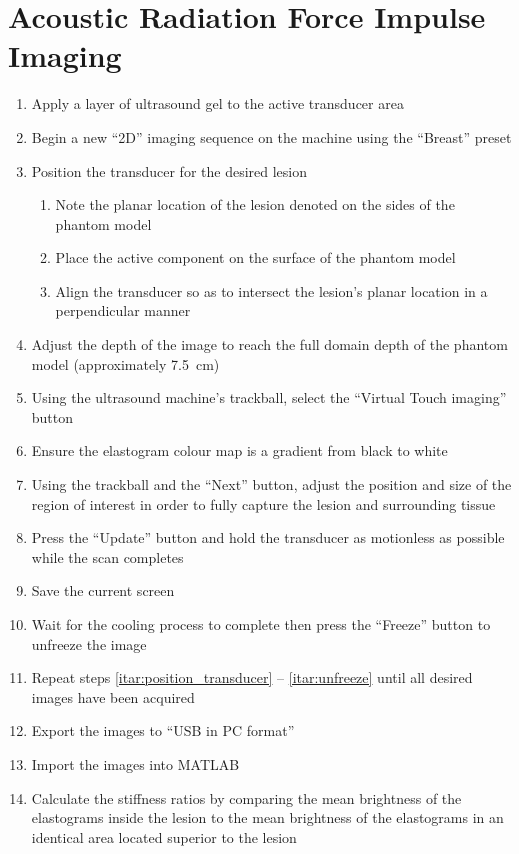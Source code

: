 	\section{Acoustic Radiation Force Impulse Imaging}
		\label{appsec:experimental_arfi}
		\begin{enumerate}
			\item Apply a layer of ultrasound gel to the active transducer area
			\item Begin a new ``2D'' imaging sequence on the machine using the ``Breast'' preset
			\item \label{itar:position_transducer} Position the transducer for the desired lesion
			\begin{enumerate}
				\item Note the planar location of the lesion denoted on the sides of the phantom model
				\item Place the active component on the surface of the phantom model
				\item Align the transducer so as to intersect the lesion's planar location in a perpendicular manner
			\end{enumerate}
			\item Adjust the depth of the image to reach the full domain depth of the phantom model (approximately \SI{7.5}{\cm})
			\item Using the ultrasound machine's trackball, select the ``Virtual Touch imaging'' button
			\item Ensure the elastogram colour map is a gradient from black to white
			\item Using the trackball and the ``Next'' button, adjust the position and size of the region of interest in order to fully capture the lesion and surrounding tissue
			\item Press the ``Update'' button and hold the transducer as motionless as possible while the scan completes
			\item Save the current screen
			\item \label{itar:unfreeze} Wait for the cooling process to complete then press the ``Freeze'' button to unfreeze the image
			\item Repeat steps \ref{itar:position_transducer} -- \ref{itar:unfreeze} until all desired images have been acquired
			\item Export the images to ``USB in PC format''
			\item Import the images into MATLAB\textsuperscript{\textregistered}
			\item Calculate the stiffness ratios by comparing the mean brightness of the elastograms inside the lesion to the mean brightness of the elastograms in an identical area located superior to the lesion
		\end{enumerate}

